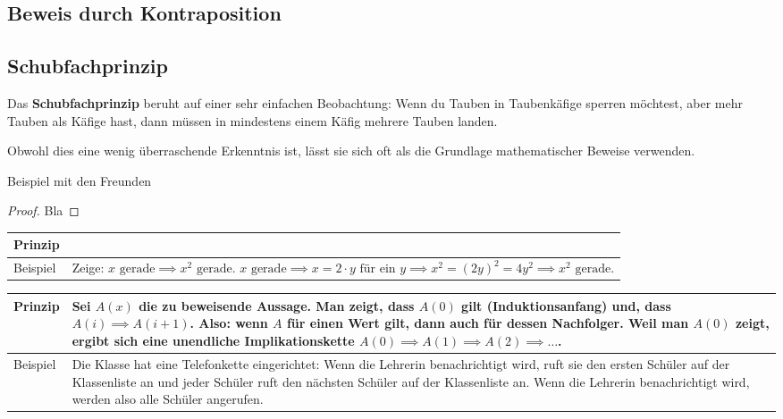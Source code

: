 \documentclass[../../main.tex]{subfiles}
\begin{document}
    \subsection{Beweis durch Kontraposition}
    \subsection{Schubfachprinzip}
    Das \textbf{Schubfachprinzip} beruht auf einer sehr einfachen Beobachtung: Wenn du Tauben in Taubenkäfige sperren möchtest, aber mehr Tauben als Käfige hast, dann müssen in mindestens einem Käfig mehrere Tauben landen.
    
    Obwohl dies eine wenig überraschende Erkenntnis ist, lässt sie sich oft als die Grundlage mathematischer Beweise verwenden.
    
    \begin{example}{}
        Beispiel mit den Freunden
        \begin{proof}
            Bla
        \end{proof}
    \end{example}
    
    \label{advanced-proofs}
    \newcommand{\dispProof}[3]{
        \begin{tcolorbox}[title=#1, fonttitle=\fontfamily{pbk}\selectfont\bfseries\large, sharp corners]%
            \arrayrulecolor{tcbcolframe}%
            \begin{tabularx}{\linewidth}{@{}>{\fontfamily{pbk}\selectfont}lX@{}}
                Prinzip & #2\\\midrule
                Beispiel & #3
            \end{tabularx}
        \end{tcolorbox}
    }
    
    \dispProof{Direkter Beweis}
        {}
        {Zeige: $x\text{ gerade} \implies x^2\text{ gerade}$. $x\text{ gerade} \implies x=2\cdot y \text{ für ein }y \implies x^2=(2y)^2=4y^2 \implies x^2 \text{ gerade}$.}
    
    \dispProof{Vollständige Induktion}
        {Sei $A(x)$ die zu beweisende Aussage. Man zeigt, dass $A(0)$ gilt (Induktionsanfang) und, dass $A(i) \implies A(i+1)$. Also: wenn $A$ für einen Wert gilt, dann auch für dessen Nachfolger. Weil man $A(0)$ zeigt, ergibt sich eine unendliche Implikationskette $A(0) \implies A(1) \implies A(2) \implies \dots$.}
        {Die Klasse hat eine Telefonkette eingerichtet: Wenn die Lehrerin benachrichtigt wird, ruft sie den ersten Schüler auf der Klassenliste an und jeder Schüler ruft den nächsten Schüler auf der Klassenliste an. Wenn die Lehrerin benachrichtigt wird, werden also alle Schüler angerufen.}
    
\end{document}

